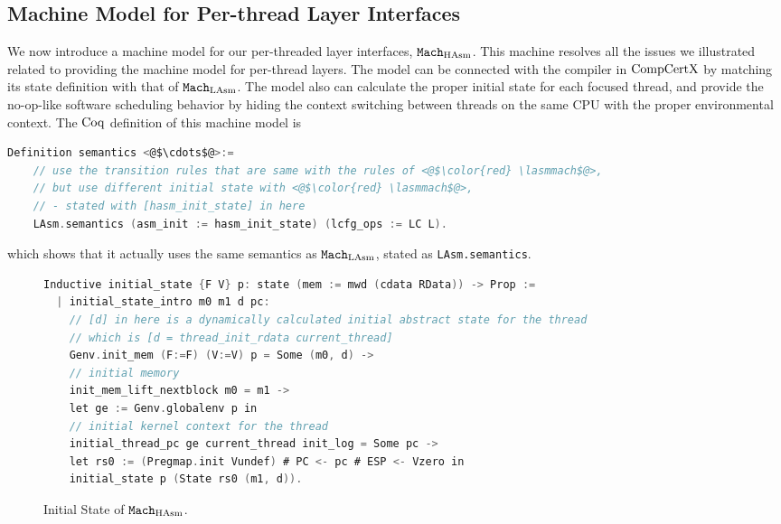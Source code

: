 \subsection{Machine Model for Per-thread  Layer Interfaces}
\label{chapter:linking:subsec:machine-model-for-single-threaded}

We now introduce a machine model for our per-threaded layer interfaces, ${\mathrm{\texttt{Mach}}}_{\mathrm{HAsm}}$.
This machine resolves all the issues  we  illustrated related to providing the machine model for per-thread  layers. 
The model can be connected with the compiler in $\mathrm{CompCertX}$ by matching its state definition with that of ${\mathrm{\texttt{Mach}}}_{\mathrm{LAsm}}$. 
The model also can calculate the proper initial state for each focused thread,
and provide the no-op-like software scheduling behavior by hiding the context switching between threads on the same CPU with the proper environmental context. 
The $\mathrm{Coq}$ definition of this machine model is 
\begin{lstlisting}[language=C, numbersep=5pt]
  Definition semantics <@$\cdots$@>:=
    // use the transition rules that are same with the rules of <@$\color{red} \lasmmach$@>,
    // but use different initial state with <@$\color{red} \lasmmach$@>,
    // - stated with [hasm_init_state] in here
    LAsm.semantics (asm_init := hasm_init_state) (lcfg_ops := LC L).
\end{lstlisting}
which shows that it actually uses the same semantics as  ${\mathrm{\texttt{Mach}}}_{\mathrm{LAsm}}$,  stated as \lstinline$LAsm.semantics$.


\begin{figure}
\begin{lstlisting}[language=C]
Inductive initial_state {F V} p: state (mem := mwd (cdata RData)) -> Prop :=
  | initial_state_intro m0 m1 d pc:
    // [d] in here is a dynamically calculated initial abstract state for the thread
    // which is [d = thread_init_rdata current_thread]
    Genv.init_mem (F:=F) (V:=V) p = Some (m0, d) ->
    // initial memory 
    init_mem_lift_nextblock m0 = m1 ->
    let ge := Genv.globalenv p in
    // initial kernel context for the thread 
    initial_thread_pc ge current_thread init_log = Some pc ->
    let rs0 := (Pregmap.init Vundef) # PC <- pc # ESP <- Vzero in
    initial_state p (State rs0 (m1, d)).
\end{lstlisting}
\caption{Initial State of ${\mathrm{\texttt{Mach}}}_{\mathrm{HAsm}}$.}
\label{fig:chapter:linking:initial-state-of-hasm}
\end{figure}


